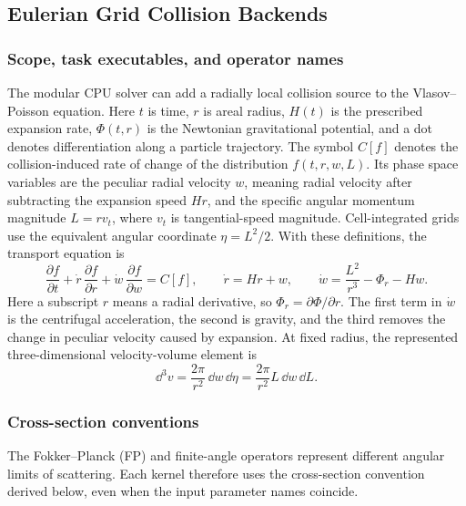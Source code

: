 \subsection{Eulerian Grid Collision Backends}
\label{sec:eulerian-grid-collisions}

\subsubsection{Scope, task executables, and operator names}

The modular CPU solver can add a radially local collision source to the
Vlasov--Poisson equation.  Here \(t\) is time, \(r\) is areal radius,
\(H(t)\) is the prescribed expansion rate, \(\Phi(t,r)\) is the Newtonian
gravitational potential, and a dot denotes differentiation along a particle
trajectory.  The symbol \(C[f]\) denotes the collision-induced rate of change
of the distribution \(f(t,r,w,L)\).  Its phase space variables are the
peculiar radial velocity \(w\), meaning radial velocity after subtracting
the expansion speed \(Hr\), and the specific angular momentum magnitude
\(L=rv_t\), where \(v_t\) is tangential-speed magnitude.  Cell-integrated
grids use the equivalent angular coordinate \(\eta=L^2/2\).  With these
definitions, the transport equation is
\[
 \frac{\partial f}{\partial t}
 +\dot r\,\frac{\partial f}{\partial r}
 +\dot w\,\frac{\partial f}{\partial w}
 =C[f],
 \qquad
 \dot r=Hr+w,\qquad
 \dot w=\frac{L^2}{r^3}-\Phi_r-Hw.                 \tag{EGC1}
\]
Here a subscript \(r\) means a radial derivative, so
\(\Phi_r=\partial\Phi/\partial r\).  The first term in
\(\dot w\) is the centrifugal acceleration, the second is gravity, and the
third removes the change in peculiar velocity caused by expansion.  At fixed
radius, the represented three-dimensional velocity-volume element is
\[
 \dd^3v=\frac{2\pi}{r^2}\,\dd w\,\dd\eta
       =\frac{2\pi}{r^2}L\,\dd w\,\dd L.            \tag{EGC2}
\]

\subsubsection{Cross-section conventions}

The Fokker--Planck (FP) and finite-angle operators represent different angular
limits of scattering.  Each kernel therefore uses the cross-section
convention derived below, even when the input parameter names coincide.

